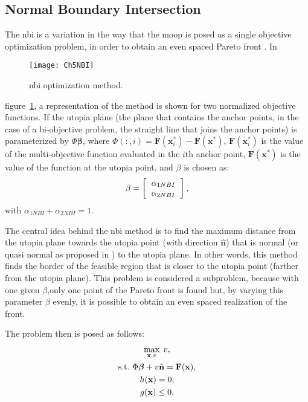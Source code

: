 \subsection{Normal Boundary Intersection}
\label{sec:NBI}
%
The \gls{nbi} is a variation in the way that the \gls{moop} is posed as a single objective optimization problem, in order to obtain an even spaced Pareto front \citep{Das1998}. In %
%
\begin{figure}[b]%
	\centering
	\texttt{[image: Ch5NBI]}%
	\caption{\gls{nbi} optimization method.}%
	\label{fig:NBI}%
\end{figure}
%
figure~\ref{fig:NBI}, a representation of the method is shown for two normalized objective functions. If the utopia plane (the plane that contains the anchor points, in the case of a bi-objective problem, the straight line that joins the anchor points) is parameterized by $\Phi\mathbf{\beta}$, where $\Phi(:,i)=\mathbf{F}(\mathbf{x}_i^*)-\mathbf{F}(\mathbf{x}^*)$, $\mathbf{F}(\mathbf{x}_i^*)$ is the value of the multi-objective function evaluated in the $i$th anchor point, $\mathbf{F}(\mathbf{x}^*)$ is the value of the function at the utopia point, and $\beta$ is chosen as:
\begin{equation}
\beta=
\left[\begin{tabular}{c}
$\alpha_{1NBI}$ \\ $\alpha_{2NBI}$
\end{tabular}\right],
\label{eq:Beta}
\end{equation}
with $\alpha_{1NBI}+\alpha_{2NBI}=1$.

The central idea behind the \gls{nbi} method is to find the maximum distance from the utopia plane towards the utopia point (with direction $\hat{\mathbf{n}}$) that is normal (or quasi normal as proposed in \citet{Das1998}) to the utopia plane. In other words, this method finds the border of the feasible region that is closer to the utopia point (farther from the utopia plane). This problem is considered a subproblem, because with one given $\beta$,only one point of the Pareto front is found but, by varying this parameter $\beta$ evenly, it is possible to obtain an even spaced realization of the front.

The problem then is posed as follows:%
%
\begin{equation}
\begin{gathered}
\max_{\mathbf{x},v}{\;v}, \\
\text{s.t.} \ \Phi \boldsymbol{\beta} + v \hat{\mathbf{n}} = \mathbf{F}(\mathbf{x}),\\
h(\mathbf{x})=0, \\
g(\mathbf{x}) \leq 0.
\end{gathered}
\label{eq:NBIProblem}
\end{equation}%

